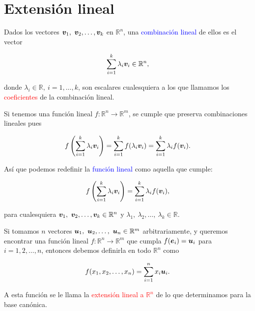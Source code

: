 \documentclass{article}
\theoremstyle{definicion}
\theoremstyle{definition}             %
\theoremstyle{definition}             %
\theoremstyle{definition}
\theoremstyle{definition}
\theoremstyle{observacion}
\theoremstyle{definition}
\theoremstyle{plain}
\theoremstyle{definition}
\theoremstyle{afirmacion}
\theoremstyle{notation}
\theoremstyle{definition}
\begin{document}
    \section{Extensión lineal}

    Dados los vectores \(\vb*{v}_{1},\ \vb*{v}_{2}, \dots, \vb*{v}_{k}\) en \(\mathbb{R}^{n}\), una \textcolor{blue}{combinación lineal} de ellos es el vector

    \begin{equation*}
        \sum_{i = 1}^{k} \lambda_{i} \vb*{v}_{i}\in\mathbb{R}^{n},
    \end{equation*}

    donde \(\lambda_{i}\in\mathbb{R},\ i = 1, \dots, k\), son escalares cualesquiera a los que llamamos los \textcolor{red}{coeficientes} de la combinación lineal.

    Si tenemos una función lineal \(f \colon \mathbb{R}^{n} \to \mathbb{R}^{m}\), se cumple que preserva combinaciones lineales pues

    \begin{equation*}
        f\left(\sum_{i = 1}^{k} \lambda_{i} \vb*{v}_{i}\right) = \sum_{i = 1}^{k} f(\lambda_{i} \vb*{v}_{i}) = \sum_{i = 1}^{k} \lambda_{i} f(\vb*{v}_{i}).
    \end{equation*}
    
    Así que podemos redefinir la \textcolor{blue}{función lineal} como aquella que cumple:
    
    \begin{equation*}
        f\left(\sum_{i = 1}^{k} \lambda_{i} \vb*{v}_{i}\right) = \sum_{i = 1}^{k} \lambda_{i} f(\vb*{v}_{i}),
    \end{equation*}

    para cualesquiera \(\vb*{v}_{1},\ \vb*{v}_{2}, \dots, \vb*{v}_{k}\in\mathbb{R}^{n}\) y \(\lambda_{1},\ \lambda_{2}, \dots,\ \lambda_{k}\in\mathbb{R}\).

    Si tomamos \(n\) vectores \(\vb*{u}_{1},\ \vb*{u}_{2}, \dots,\ \vb*{u}_{n} \in \mathbb{R}^{m}\) arbitrariamente, y queremos encontrar una función lineal \(f \colon \mathbb{R}^{n} \to \mathbb{R}^{m}\) que cumpla \(f(\vb*{e}_{i}) = \vb*{u}_{i}\) para \(i = 1, 2, \dots, n\), entonces debemos definirla en todo \(\mathbb{R}^{n}\) como

    \begin{equation*}
        f(x_{1}, x_{2}, \dots, x_{n}) = \sum_{i = 1}^{n} x_{i} \vb*{u}_{i}.
    \end{equation*}

    A esta función se le llama la \textcolor{red}{extensión lineal a \(\mathbb{R}^{n}\)} de lo que determinamos para la base canónica.
\end{document}
